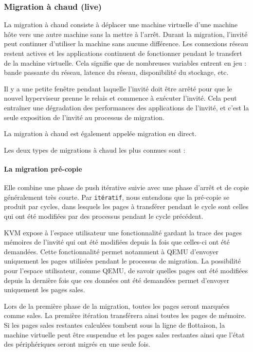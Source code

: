 \subsubsection{Migration à chaud (live)}
La migration à chaud consiste à déplacer une machine virtuelle d'une machine hôte vers une autre machine sans la mettre à l'arrêt. 
Durant la migration, l'invité peut continuer d'utiliser la machine sans aucune différence.
Les connexions réseau restent actives et les applications continuent de fonctionner pendant le transfert de la machine virtuelle.
Cela signifie que de nombreuses variables entrent en jeu : bande passante du réseau, latence du réseau, disponibilité du stockage, etc.

Il y a une petite fenêtre pendant laquelle l'invité doit être arrêté pour que le nouvel hyperviseur prenne le relais et commence à exécuter l'invité.
Cela peut entraîner une dégradation des performances des applications de l'invité, et c'est la seule exposition de l'invité au processus de migration.

La migration à chaud est également appelée migration en direct.

Les deux types de migrations à chaud les plus connues sont :

\paragraph*{La migration pré-copie}
Elle combine une phase de push itérative suivie avec une phase d'arrêt et de copie généralement très courte.
Par \texttt{itératif}, nous entendons que la pré-copie se produit par cycles, dans lesquels les pages à transférer pendant le cycle sont celles qui ont été modifiées par des processus pendant le cycle précédent.

KVM expose à l'espace utilisateur une fonctionnalité gardant la trace des pages mémoires de l'invité qui ont été modifiées depuis la fois que celles-ci ont été demandées. 
Cette fonctionnalité permet notamment à QEMU d'envoyer uniquement les pages utilisées pendant le processus de migration.
La possibilité pour l'espace utilisateur, comme QEMU, de savoir quelles pages ont été modifiées depuis la dernière fois que ces données ont été demandées permet d'envoyer uniquement les pages sales.

Lors de la première phase de la migration, toutes les pages seront marquées comme sales.
La première itération transférera ainsi toutes les pages de mémoire.
Si les pages sales restantes calculées tombent sous la ligne de flottaison, la machine virtuelle peut être suspendue et les pages sales restantes ainsi que l'état des périphériques seront migrés en une seule fois.

